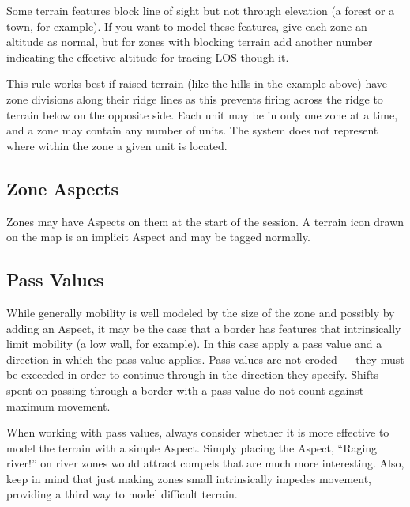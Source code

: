 Some terrain features block line of sight but not through elevation (a forest or a town, for example). If you want to model these features, give each zone an altitude as normal, but for zones with blocking terrain add another number indicating the effective altitude for tracing LOS though it.

This rule works best if raised terrain (like the hills in the example above) have zone divisions along their ridge lines as this prevents firing across the ridge to terrain below on the opposite side. Each unit may be in only one zone at a time, and a zone may contain any number of units. The system does not represent where within the zone a given unit is located.

\vfil

\subsection{Zone Aspects}
\label{sec:platoon-combat-zone-aspects}

Zones may have Aspects on them at the start of the session. A terrain icon drawn on the map is an implicit Aspect and may be tagged normally.


\subsection{Pass Values}
\label{sec:platoon-combat-pass-values}

While generally mobility is well modeled by the size of the zone and possibly by adding an Aspect, it may be the case that a border has features that intrinsically limit mobility (a low wall, for example). In this case apply a pass value and a direction in which the pass value applies. Pass values are not eroded --- they must be exceeded in order to continue through in the direction they specify. Shifts spent on passing through a border with a pass value do not count against maximum movement.

When working with pass values, always consider whether it is more effective to model the terrain with a simple Aspect. Simply placing the Aspect, ``Raging river!'' on river zones would attract compels that are much more interesting. Also, keep in mind that just making zones small intrinsically impedes movement, providing a third way to model difficult terrain.

